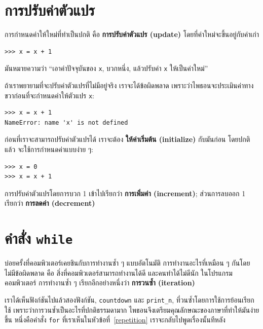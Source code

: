 \section{การปรับค่าตัวแปร} %
\label{update}


การกำหนดค่าให้ใหม่ที่ทำเป็นปกติ คือ {\bf การปรับค่าตัวแปร (update)} 
โดยที่ค่าใหม่จะขึ้นอยู่กับค่าเก่า


\begin{verbatim}
>>> x = x + 1
\end{verbatim}
%
มันหมายความว่า ``เอาค่าปัจจุบันของ {\tt x}, บวกหนึ่ง, แล้วปรับค่า {\tt x} ให้เป็นค่าใหม่''

ถ้าเราพยายามที่จะปรับค่าตัวแปรที่ไม่มีอยู่จริง เราจะได้ข้อผิดพลาด เพราะว่าไพธอนจะประเมินค่าทางขวาก่อนที่จะกำหนดค่าให้ตัวแปร {\tt x}:

\begin{verbatim}
>>> x = x + 1
NameError: name 'x' is not defined
\end{verbatim}
%
ก่อนที่เราจะสามารถปรับค่าตัวแปรได้ เราจะต้อง {\bf ให้ค่าเริ่มต้น (initialize)} กับมันก่อน
โดยปกติแล้ว จะใช้การกำหนดค่าแบบง่าย ๆ:

\begin{verbatim}
>>> x = 0
>>> x = x + 1
\end{verbatim}
%
การปรับค่าตัวแปรโดยการบวก 1 เข้าไปเรียกว่า {\bf การเพิ่มค่า (increment)};
ส่วนการลบออก 1 เรียกว่า {\bf การลดค่า (decrement)}



\section{คำสั่ง {\tt while}}

บ่อยครั้งที่คอมพิวเตอร์เคยชินกับการทำงานซ้ำ ๆ แบบอัตโนมัติ การทำงานอะไรที่เหมือน ๆ 
กันโดยไม่มีข้อผิดพลาด คือ สิ่งที่คอมพิวเตอร์สามารถทำงานได้ดี และคนทำได้ไม่ดีนัก
ในโปรแกรมคอมพิวเตอร์ การทำงานซ้ำ ๆ เรียกอีกอย่างหนึ่งว่า {\bf การวนซ้ำ (iteration)}

เราได้เห็นฟังก์ชันไปแล้วสองฟังก์ชัน, {\tt countdown} และ \verb"print_n", ที่วนซ้ำโดยการใช้การย้อนเรียกใช้
เพราะว่าการวนซ้ำเป็นอะไรที่ปกติธรรมดามาก ไพธอนจึงเตรียมคุณลักษณะของภาษาที่ทำให้มันง่ายขึ้น
หนึ่งคือคำสั่ง {\tt for} ที่เราเห็นในหัวข้อที่~\ref{repetition} เราจะกลับไปพูดเรื่องนั้นทีหลัง 

